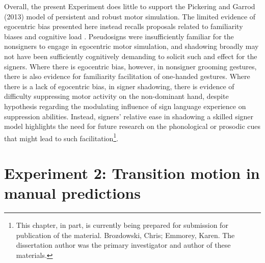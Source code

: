             Overall, the present Experiment does little to support the Pickering and Garrod (2013) model of persistent and robust motor simulation. The limited evidence of egocentric bias presented here instead recalls proposals related to familiarity biases \cite{watkins2017} and cognitive load \cite{hickok2011}. Pseudosigns were insufficiently familiar for the nonsigners to engage in egocentric motor simulation, and shadowing broadly may not have been sufficiently cognitively demanding to solicit such and effect for the signers. Where there is egocentric bias, however, in nonsigner grooming gestures, there is also evidence for familiarity facilitation of one-handed gestures. Where there is a lack of egocentric bias, in signer shadowing, there is evidence of difficulty suppressing motor activity on the non-dominant hand, despite hypothesis regarding the modulating influence of sign language experience on suppression abilities. Instead, signers’ relative ease in shadowing a skilled signer model highlights the need for future research on the phonological or prosodic cues that might lead to such facilitation\footnote{This chapter, in part, is currently being prepared for submission for publication of the material. Brozdowski, Chris; Emmorey, Karen. The dissertation author was the primary investigator and author of these materials.}. 

\section{Experiment 2: Transition motion in manual predictions}
    \label{ch:trans}
